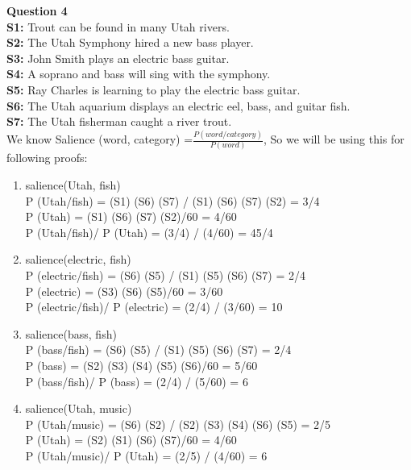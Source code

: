 \documentclass[11pt]{article}
\begin{document}
\begin{enumerate}
\newpage
{\bf Question 4}\\[15pt]
{\bf S1:} Trout can be found in many Utah rivers.  \\
{\bf S2:} The Utah Symphony hired a new bass player.  \\
{\bf S3:} John Smith plays an electric bass guitar.  \\
{\bf S4:} A soprano and bass will sing with the symphony. \\
{\bf S5:} Ray Charles is learning to play the electric bass guitar. \\
{\bf S6:} The Utah aquarium displays an electric eel, bass, and guitar fish. \\
{\bf S7:} The Utah fisherman caught a river trout. \\

We know Salience (word, category) =$\frac{P (word/category)}{P (word)}$, So we will be using this for following proofs:\\

\begin{enumerate}
\item salience(Utah, {\sc fish}) \\
P (Utah/fish) = (S1) (S6) (S7) / (S1) (S6) (S7) (S2) = 3/4 \\
P (Utah) = (S1) (S6) (S7) (S2)/60 = 4/60\\
P (Utah/fish)/ P (Utah) = (3/4) / (4/60) = 45/4 \\

\item salience(electric, {\sc fish})  \\ 
P (electric/fish) = (S6) (S5) / (S1) (S5) (S6) (S7) = 2/4 \\
P (electric) = (S3) (S6) (S5)/60 = 3/60\\
P (electric/fish)/ P (electric) = (2/4) / (3/60) = 10\\


\item salience(bass, {\sc fish})  \\ 
P (bass/fish) = (S6) (S5) / (S1) (S5) (S6) (S7) = 2/4 \\
P (bass) = (S2) (S3) (S4) (S5) (S6)/60 = 5/60 \\
P (bass/fish)/ P (bass) = (2/4) / (5/60) = 6\\

\item salience(Utah, {\sc music}) \\
P (Utah/music) = (S6) (S2) / (S2) (S3) (S4) (S6) (S5) = 2/5\\
P (Utah) = (S2) (S1) (S6) (S7)/60 = 4/60 \\
P (Utah/music)/ P (Utah) = (2/5) / (4/60) = 6\\ 


\end{enumerate}
\end{enumerate}
\end{document}
